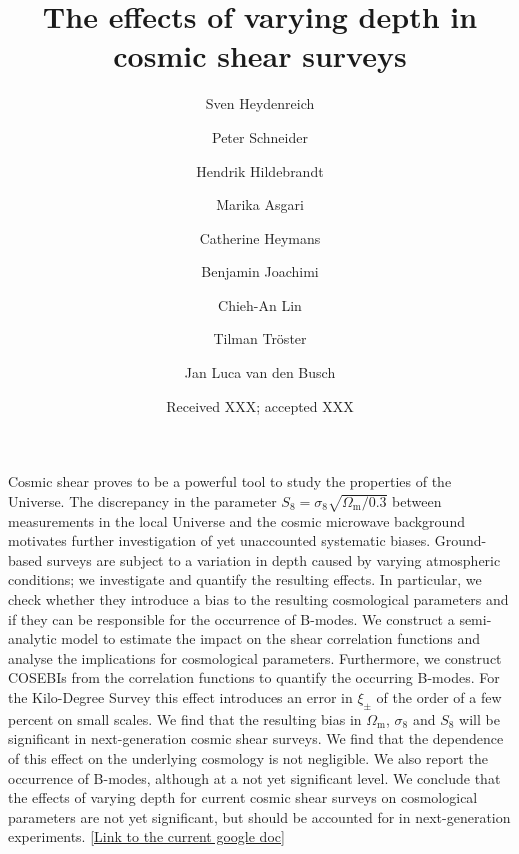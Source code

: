 \documentclass{aa}
\renewcommand{\rm}{\mathrm}
\begin{document}
 


   \title{The effects of varying depth in cosmic shear surveys}


   \author{Sven Heydenreich%
          \and Peter Schneider 
          \and Hendrik Hildebrandt
          \and Marika Asgari
          \and Catherine Heymans 
          \and Benjamin Joachimi
          \and Chieh-An Lin
          \and Tilman Tr\"{o}ster
          \and Jan Luca van den Busch
          }

   \date{Received XXX; accepted XXX}

  \abstract
   {Cosmic shear proves to be a powerful tool to study the properties of the Universe. The discrepancy in the parameter $S_8 = \sigma_8\sqrt{\Omega_{\rm{m}}/0.3}$ between measurements in the local Universe and the cosmic microwave background motivates further investigation of yet unaccounted systematic biases. 
   Ground-based surveys are subject to a variation in depth caused by varying atmospheric conditions; we investigate and quantify the resulting effects. In particular, we check whether they introduce a bias to the resulting cosmological parameters and if they can be responsible for the occurrence of B-modes.
   We construct a semi-analytic model to estimate the impact on the shear correlation functions and analyse the implications for cosmological parameters. Furthermore, we construct COSEBIs from the correlation functions to quantify the occurring B-modes.
   For the Kilo-Degree Survey this effect introduces an error in $\xi_\pm$ of the order of a few percent on small scales. We find that the resulting bias in $\Omega_{\rm m}$, $\sigma_8$ and $S_8$ will be significant in next-generation cosmic shear surveys. We find that the dependence of this effect on the underlying cosmology is not negligible. We also report the occurrence of B-modes, although at a not yet significant level.
   We conclude that the effects of varying depth for current cosmic shear surveys on cosmological parameters are not yet significant, but should be accounted for in next-generation experiments. \textcolor{blue}{\href{https://docs.google.com/document/d/13j7fUE8jrK5HOVbf4p0HdQs6c14jbWtm9Yq8CtLZCK4/edit?usp=sharing}{[Link to the current google doc]}}}
\end{document}
